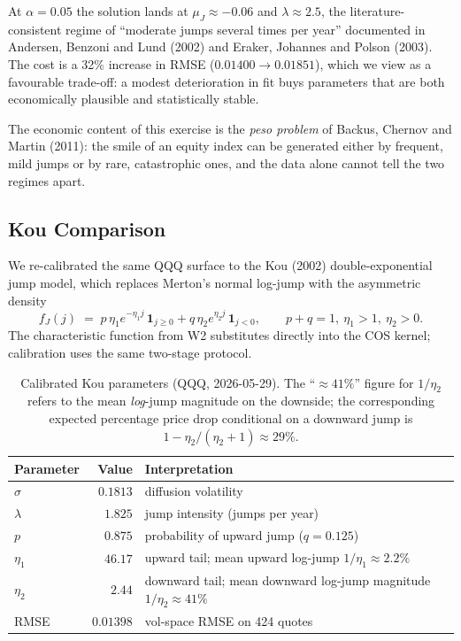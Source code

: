 At $\alpha = 0.05$ the solution lands at $\mu_J \approx -0.06$ and
$\lambda \approx 2.5$, the literature-consistent regime of ``moderate
jumps several times per year'' documented in Andersen, Benzoni and Lund
(2002) and Eraker, Johannes and Polson (2003). The cost is a 32\%
increase in RMSE ($0.01400 \to 0.01851$), which we view as a favourable
trade-off: a modest deterioration in fit buys parameters that are both
economically plausible and statistically stable.


The economic content of this exercise is the \emph{peso problem} of
Backus, Chernov and Martin (2011): the smile of an equity index can be
generated either by frequent, mild jumps or by rare, catastrophic ones,
and the data alone cannot tell the two regimes apart.


\subsection*{Kou Comparison}

We re-calibrated the same QQQ surface to the Kou (2002)
double-exponential jump model, which replaces Merton's normal log-jump
with the asymmetric density
\[
   f_J(j) \;=\; p\,\eta_1 e^{-\eta_1 j}\,\mathbf{1}_{j \geq 0}
              + q\,\eta_2 e^{\eta_2 j}\,\mathbf{1}_{j < 0},
   \qquad p + q = 1,\ \eta_1 > 1,\ \eta_2 > 0.
\]
The characteristic function from W2 substitutes directly into the COS
kernel; calibration uses the same two-stage protocol.

\begin{table}[H]
\centering
\caption{Calibrated Kou parameters (QQQ, 2026-05-29). The
``$\approx 41\%$'' figure for $1/\eta_2$ refers to the mean
\emph{log}-jump magnitude on the downside; the corresponding expected
percentage price drop conditional on a downward jump is
$1 - \eta_2/(\eta_2 + 1) \approx 29\%$.}
\begin{tabular}{lrl}
\toprule
Parameter      & Value     & Interpretation \\
\midrule
$\sigma$       & $0.1813$  & diffusion volatility \\
$\lambda$      & $1.825$   & jump intensity (jumps per year) \\
$p$            & $0.875$   & probability of upward jump ($q = 0.125$) \\
$\eta_1$       & $46.17$   & upward tail; mean upward log-jump $1/\eta_1 \approx 2.2\%$ \\
$\eta_2$       & $2.44$    & downward tail; mean downward log-jump magnitude $1/\eta_2 \approx 41\%$ \\
RMSE           & $0.01398$ & vol-space RMSE on 424 quotes \\
\bottomrule
\end{tabular}
\end{table}

